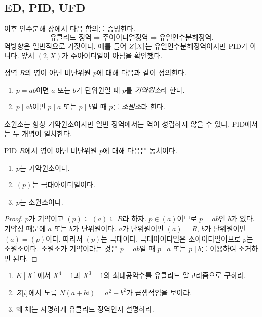 \subsection{ED, PID, UFD}

이후 인수분해 장에서 다음 함의를 증명한다.
\[
  \text{유클리드 정역}
  \Longrightarrow
  \text{주아이디얼정역}
  \Longrightarrow
  \text{유일인수분해정역}.
\]
역방향은 일반적으로 거짓이다. 예를 들어 $Z[X]$는 유일인수분해정역이지만 PID가 아니다. 앞서 $(2,X)$가 주아이디얼이 아님을 확인했다.

\begin{definition}
정역 $R$의 영이 아닌 비단위원 $p$에 대해 다음과 같이 정의한다.
\begin{enumerate}[label=(\roman*)]
  \item $p=ab$이면 $a$ 또는 $b$가 단위원일 때 $p$를 \emph{기약원소}라 한다.
  \item $p\mid ab$이면 $p\mid a$ 또는 $p\mid b$일 때 $p$를 \emph{소원소}라 한다.
\end{enumerate}
\end{definition}

소원소는 항상 기약원소이지만 일반 정역에서는 역이 성립하지 않을 수 있다. PID에서는 두 개념이 일치한다.

\begin{proposition}
PID $R$에서 영이 아닌 비단위원 $p$에 대해 다음은 동치이다.
\begin{enumerate}[label=(\roman*)]
  \item $p$는 기약원소이다.
  \item $(p)$는 극대아이디얼이다.
  \item $p$는 소원소이다.
\end{enumerate}
\end{proposition}

\begin{proof}
$p$가 기약이고 $(p)\subseteq(a)\subseteq R$라 하자. $p\in(a)$이므로 $p=ab$인 $b$가 있다. 기약성 때문에 $a$ 또는 $b$가 단위원이다. $a$가 단위원이면 $(a)=R$, $b$가 단위원이면 $(a)=(p)$이다. 따라서 $(p)$는 극대이다. 극대아이디얼은 소아이디얼이므로 $p$는 소원소이다. 소원소가 기약이라는 것은 $p=ab$일 때 $p\mid a$ 또는 $p\mid b$를 이용하여 소거하면 된다.
\end{proof}

\begin{checkpoint}
\begin{enumerate}[label=(\alph*)]
  \item $K[X]$에서 $X^4-1$과 $X^3-1$의 최대공약수를 유클리드 알고리즘으로 구하라.
  \item $Z[i]$에서 노름 $N(a+bi)=a^2+b^2$가 곱셈적임을 보이라.
  \item 왜 체는 자명하게 유클리드 정역인지 설명하라.
\end{enumerate}
\end{checkpoint}
